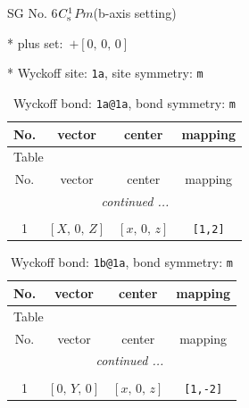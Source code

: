 \documentclass[fleqn,8pt]{jsarticle}
\begin{document}
\setcounter{MaxMatrixCols}{32}

\renewcommand{\tablename}{Table~}
\renewcommand{\figurename}{Figure~}
\begin{center}
\LARGE
SG No. 6\quad$C_{\rm s}^{1}$\quad$Pm$\quad(b-axis setting)\quad[ monoclinic ]
\end{center}

* plus set:\,\,\,$+\left[ 0,\, 0,\, 0 \right]$


* Wyckoff site: {\tt 1a}, site symmetry: {\tt m}
\renewcommand{\arraystretch}{1.2}
\begin{longtable}{cccc}
\caption{Wyckoff bond: {\tt 1a@1a}, bond symmetry: {\tt m}}
 \\
 \hline \hline
No. & vector & center & mapping \\ \hline \endfirsthead

\multicolumn{3}{l}{\tablename\ \thetable{}} \\
 \hline \hline
No. & vector & center & mapping \\ \hline \endhead

 \hline \hline
\multicolumn{3}{r}{\footnotesize\it continued ...} \\ \endfoot

 \hline \hline
\multicolumn{3}{r}{} \\ \endlastfoot

1 & $\left[ X,\, 0,\, Z \right]$ & $\left[ x,\, 0,\, z \right]$ & {\tt [1,2]} \\
\end{longtable}
\renewcommand{\arraystretch}{1.2}
\begin{longtable}{cccc}
\caption{Wyckoff bond: {\tt 1b@1a}, bond symmetry: {\tt m}}
 \\
 \hline \hline
No. & vector & center & mapping \\ \hline \endfirsthead

\multicolumn{3}{l}{\tablename\ \thetable{}} \\
 \hline \hline
No. & vector & center & mapping \\ \hline \endhead

 \hline \hline
\multicolumn{3}{r}{\footnotesize\it continued ...} \\ \endfoot

 \hline \hline
\multicolumn{3}{r}{} \\ \endlastfoot

1 & $\left[ 0,\, Y,\, 0 \right]$ & $\left[ x,\, 0,\, z \right]$ & {\tt [1,-2]} \\
\end{longtable}
\end{document}
